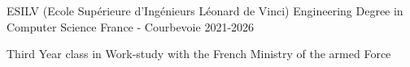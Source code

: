 

\begin{cventries}

  \cventry
    {ESILV (Ecole Supérieure d'Ingénieurs Léonard de Vinci)} %
    {Engineering Degree in Computer Science} %
    {France - Courbevoie} %
    {2021-2026} %
    {
      \begin{cvitems} %
        \item {Third Year class in Work-study with the French Ministry of the armed Force}
      \end{cvitems}
    }
    {}
    
\end{cventries}
